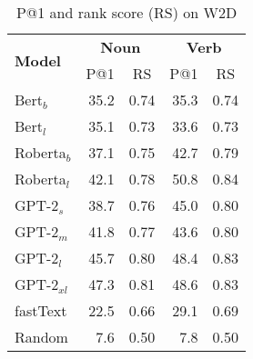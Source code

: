 \documentclass[11pt,a4paper]{article}
\begin{document}
\begin{table}
    \centering
    \begin{tabular}{l|rrrr}
        \hline
         \multirow{2}{*}{\textbf{Model}} & \multicolumn{2}{c}{\textbf{Noun}} & \multicolumn{2}{c}{\textbf{Verb}} \\
         & \multicolumn{1}{c}{P@1} & \multicolumn{1}{c}{RS} & \multicolumn{1}{c}{P@1} & \multicolumn{1}{c}{RS} \\ \hline
     Bert$_{b}$ & 35.2 & 0.74 & 35.3 & 0.74 \\
     Bert$_{l}$ & 35.1 & 0.73 & 33.6 & 0.73 \\
     Roberta$_{b}$ & 37.1 & 0.75 & 42.7 & 0.79 \\
     Roberta$_{l}$ & 42.1 & 0.78 & 50.8 & 0.84 \\ \hline
     GPT-2$_{s}$ & 38.7 & 0.76 & 45.0 & 0.80 \\
     GPT-2$_{m}$ & 41.8 & 0.77 & 43.6 & 0.80 \\
     GPT-2$_{l}$ & 45.7 & 0.80 & 48.4 & 0.83 \\
     GPT-2$_{xl}$ & 47.3 & 0.81 & 48.6 & 0.83 \\
     \hline 
     fastText & 22.5 & 0.66 & 29.1 & 0.69 \\ \hline 
     Random & 7.6 & 0.50 & 7.8 & 0.50 \\\hline
     
    \end{tabular}
    \caption{P@1 and rank score (RS) on W2D}
    \label{tab:results_W2D}
\end{table}


     
\end{document}
